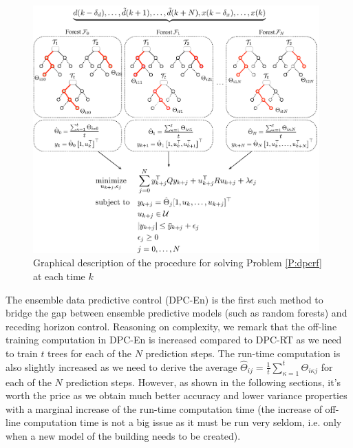 \begin{figure}[t!]
	\centering
	\includegraphics[width=26pc]{figures/dpc-algo-rf.eps}
	\caption{\textcolor[rgb]{0,0,1}{Graphical description of the procedure for solving Problem \ref{P:dpcrf} at each time $k$}}
	\label{F:dpc-algo-rf}
\end{figure}

\textcolor[rgb]{0,0,1}{The ensemble data predictive control (DPC-En) is the first such method to bridge the gap between ensemble predictive models (such as random forests) and receding horizon control. Reasoning on complexity, we remark that the off-line training computation in DPC-En is increased compared to DPC-RT as we need to train $t$ trees for each of the $N$ prediction steps. The run-time computation is also slightly increased as we need to derive the average $\hat{\Theta}_{ij} = \frac{1}{t}\sum\limits_{\kappa = 1}^{t} \Theta_{i \kappa j}$ for each of the $N$ prediction steps. However, as shown in the following sections, it's worth the price as we obtain much better accuracy and lower variance properties with a marginal increase of the run-time computation time (the increase of off-line computation time is not a big issue as it must be run very seldom, i.e. only when a new model of the building needs to be created).}






